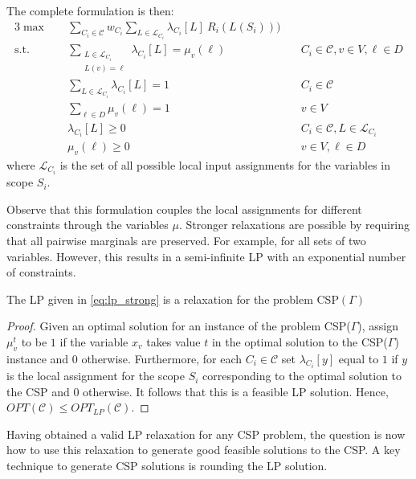 The complete formulation is then:
\begin{alignat}{3}
\max \quad & \sum_{C_i \in \mathcal{C}} w_{C_i} \sum_{ L \in \mathcal{L}_{C_i} }  \lambda_{C_i}[L] \  R_i(L(S_i))) \label{eq:lp_strong}\\
\text{s.t.} \quad & 	\sum_{\substack{L \in \mathcal{L}_{C_i}\\ L(v) = \ell }} \lambda_{C_i}[L] = \mu_v(\ell) & \quad C_i \in \mathcal{C}, v \in V, \ell \in D \nonumber \\
& \sum_{L \in \mathcal{L}_{C_i}} \lambda_{C_i}[ L ] = 1 & \quad  C_i \in \mathcal{C} \nonumber\\
& \sum_{\ell \in D} \mu_v(\ell) = 1 & \quad v \in V \nonumber\\
& \lambda_{C_i}[ L ] \ge 0 & \quad C_i \in \mathcal{C}, L \in \mathcal{L}_{C_i} \nonumber\\
&	\mu_v(\ell) \ge 0	& \quad v \in  V, \ell \in D \nonumber
\end{alignat}
where $\mathcal{L}_{C_i}$ is the set of all possible local input assignments for the variables in scope $S_i$.

Observe that this formulation couples the local assignments for different constraints through the variables $\mu$. 
Stronger relaxations are possible by requiring that all pairwise marginals are preserved. For example, for all sets of two variables. 
However, this results in a semi-infinite LP with an exponential number of constraints. 

\begin{thm}
	The LP given in \eqref{eq:lp_strong} is a relaxation for the problem CSP$(\Gamma)$
\end{thm}
\begin{proof}
	Given an optimal solution for an instance of the problem CSP($\Gamma$), assign $\mu_v^t$ to be $1$ if the variable $x_v$ takes value $t$ in the optimal solution to the CSP($\Gamma$) instance and $0$ otherwise.
	Furthermore, for each $C_i \in \mathcal{C}$ set $\lambda_{C_i}[y]$ equal to $1$ if $y$ is the local assignment for the scope $S_i$ corresponding to the optimal solution to the CSP and $0$ otherwise. 
	It follows that this is a feasible LP solution. 
	Hence, $OPT(\mathcal{C}) \le OPT_{LP}(\mathcal{C})$.
\end{proof}

Having obtained a valid LP relaxation for any CSP problem, the question is now how to use this relaxation to generate good feasible solutions to the CSP. 
A key technique to generate CSP solutions is rounding the LP solution.

